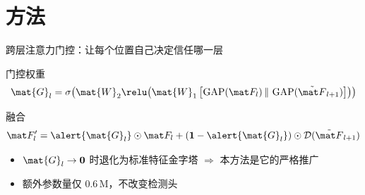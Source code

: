 \section{方法}

\begin{frame}{跨层注意力门控：让每个位置自己决定信任哪一层}
  \begin{block}{门控权重}
    \vspace{-0.6em}
    \begin{equation*}
      \mat{G}_l = \sigma\!\left(
        \mat{W}_2 \relu\!\left(
          \mat{W}_1 \left[ \operatorname{GAP}(\featmap_l) \,\Vert\,
                           \operatorname{GAP}(\tilde{\featmap}_{l+1}) \right]
        \right)
      \right)
    \end{equation*}
  \end{block}

  \vspace{0.5em}
  \begin{block}{融合}
    \vspace{-0.6em}
    \begin{equation*}
      \featmap_l' = \alert{\mat{G}_l} \odot \featmap_l
                  + (\mathbf{1} - \alert{\mat{G}_l}) \odot
                    \mathcal{D}(\tilde{\featmap}_{l+1})
    \end{equation*}
  \end{block}

  \vspace{0.6em}
  \begin{itemize}
    \item $\mat{G}_l \to \mathbf{0}$ 时退化为标准特征金字塔
          \;$\Rightarrow$\; 本方法是它的\alert{严格推广}
    \item 额外参数量仅 \num{0.6}\,M，不改变检测头
  \end{itemize}
\end{frame}

